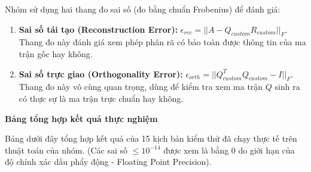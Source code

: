 Nhóm sử dụng hai thang đo sai số (đo bằng chuẩn Frobenius) để đánh giá:
\begin{enumerate}
    \item \textbf{Sai số tái tạo (Reconstruction Error):} $\epsilon_{rec} = ||A - Q_{custom}R_{custom}||_F$. Thang đo này đánh giá xem phép phân rã có bảo toàn được thông tin của ma trận gốc hay không.
    \item \textbf{Sai số trực giao (Orthogonality Error):} $\epsilon_{orth} = ||Q_{custom}^T Q_{custom} - I||_F$. Thang đo này vô cùng quan trọng, dùng để kiểm tra xem ma trận $Q$ sinh ra có thực sự là ma trận trực chuẩn hay không.
\end{enumerate}

\textbf{Bảng tổng hợp kết quả thực nghiệm}

Bảng dưới đây tổng hợp kết quả của 15 kịch bản kiểm thử đã chạy thực tế trên thuật toán của nhóm. (Các sai số $\le 10^{-14}$ được xem là bằng $0$ do giới hạn của độ chính xác dấu phẩy động - Floating Point Precision).


